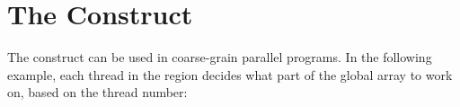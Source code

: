 \pagebreak
\section{The  Construct}
\label{sec:parallel}

The  construct  can be used in coarse-grain parallel programs. 
In the following example, each thread in the  region decides what 
part of the global array  to work on, based on the thread number:



